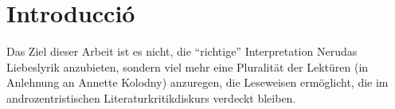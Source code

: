 \section{Introducció}

Das Ziel dieser Arbeit ist es nicht, die ``richtige'' Interpretation Nerudas Liebeslyrik anzubieten, sondern viel mehr eine Pluralität der Lektüren (in Anlehnung an Annette Kolodny) anzuregen, die Leseweisen ermöglicht, die im androzentristischen Literaturkritikdiskurs verdeckt bleiben.


\begin{comment}
1. Intro
  * Ziel von Feministischen Lektüren: zugrunde liegende Machtstrukturen in Werken und deren Rezeption aufzudecken
    ** androzentrische Perspektive der Literatur:
       *** Männer in Mittelpunkt (als Figuren)
       *** von Männern gemacht
       *** an Männer gerichtet
  * Wie erreicht? Durch eine Pluralität der Lektüren und Close Reading
ohne das ouevre Nerudas nicht als ganzes in Frage stellen
exemplarische Lektüren: Poetisierung bestimmter Heteronormativen Perspektiven
gehört historisiert; nicht als zeitlos darzustellen
\end{comment}
